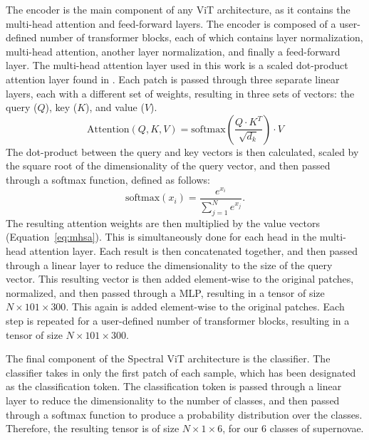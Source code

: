 The encoder is the main component of any ViT architecture, as it contains the 
multi-head attention and feed-forward layers. The encoder is composed of a user-defined number of
transformer blocks, each of which contains layer normalization, multi-head attention, another 
layer normalization, and finally a feed-forward layer. The multi-head attention layer 
used in this work is a scaled dot-product attention layer found in \textcite{vaswani2017}. Each patch 
is passed through three separate linear layers, each with a different set of weights, 
resulting in three sets of vectors: the query ($Q$), key ($K$), and value ($V$).
\begin{equation}
    \label{eq:mhsa}
    \text{Attention}(Q, K, V) = \text{softmax}\left(\frac{Q\cdot K^T}{\sqrt{d_k}}\right)\cdot V
\end{equation}
The dot-product between the query and key vectors is then calculated,
scaled by the square root of the dimensionality of the query vector, and then passed through a softmax function, 
defined as follows:
\begin{equation}
    \text{softmax}(x_i) = \frac{e^{x_i}}{\sum_{j=1}^N e^{x_j}}.
\end{equation}
The resulting attention weights are then multiplied by the value vectors (Equation~\ref{eq:mhsa}). 
This is simultaneously done for each head in the multi-head attention layer. Each result is then 
concatenated together, and then passed through a linear layer to reduce the dimensionality
to the size of the query vector. This resulting vector is then added
element-wise to the original patches, normalized, and then passed through a MLP, 
resulting in a tensor of size $N \times 101 \times 300$. This again is added element-wise to the original patches. 
Each step is repeated for a user-defined number of transformer blocks, resulting in a tensor of size
$N \times 101 \times 300$.

The final component of the Spectral ViT architecture is the classifier. The classifier
takes in only the first patch of each sample, which has been designated as the classification token.
The classification token is passed through a linear layer to reduce the dimensionality to the
number of classes, and then passed through a softmax function to produce a probability distribution
over the classes. Therefore, the resulting tensor is of size $N \times 1 \times 6$, for our 
6 classes of supernovae.

